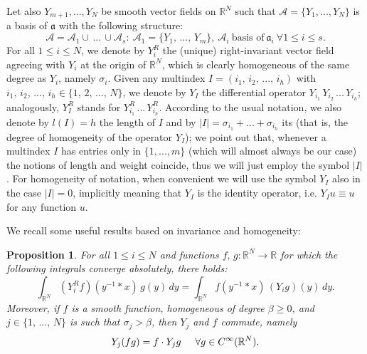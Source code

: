\documentclass{article}
\newtheorem{proposition}[theorem]{Proposition}
\numberwithin{equation}{section}
\begin{document}
Let also $Y_{m+1},...,Y_N$ be smooth vector fields on $\mathbb{R}^N$ such that $\mathcal{A}=\{Y_1,...,Y_N\}$ is a basis of $\mathfrak{a}$ with the following structure:
\begin{equation*}
    \mathcal{A}=\mathcal{A}_1 \cup \, ... \, \cup \mathcal{A}_s: \: \mathcal{A}_1=\{Y_1, \, ..., \, Y_m\}, \: \mathcal{A}_i \: \text{basis of} \: \mathfrak{a}_i \: \forall 1 \leq i \leq s.
\end{equation*}
For all $1 \leq i \leq N$, we denote by $Y_i^R$ the (unique) right-invariant vector field agreeing with $Y_i$ at the origin of $\mathbb{R}^N$, which is clearly homogeneous of the same degree as $Y_i$, namely $\sigma_i$. Given any multindex $I=(i_1, \, i_2, \, ..., \, i_h)$ with $i_1, \, i_2, \, ..., \, i_h \in \{1, \, 2, \, ..., \, N\}$, we denote by $Y_I$ the differential operator $Y_{i_1} \, Y_{i_2} \,... \,Y_{i_h}$; analogously, $Y_I^R$ stands for $Y_{i_1}^R \, ... \, Y_{i_h}^R$. According to the usual notation, we also denote by $l(I)=h$ the length of $I$ and by $|I|=\sigma_{i_1}+...+\sigma_{i_h}$ its  (that is, the degree of homogeneity of the operator $Y_I$); we point out that, whenever a multindex $I$ has entries only in $\{1,...,m\}$ (which will almost always be our case) the notions of length and weight coincide, thus we will just employ the symbol $|I|$. For homogeneity of notation, when convenient we will use the symbol $Y_I$ also in the case $|I|=0$, implicitly meaning that $Y_I$ is the identity operator, i.e. $Y_I u \equiv u$ for any function $u$.

We recall some useful results based on invariance and homogeneity:

\vspace{2mm}

\begin{proposition}
\label{prop: translations and dilations}
    For all $1 \leq i \leq N$ and functions $f, \, g: \mathbb{R}^N \to \mathbb{R}$ for which the following integrals converge absolutely, there holds:
    \begin{equation}
    \label{IPP left-right invariant vf}
        \int_{\mathbb{R}^N} (Y_i^R f)(y^{-1} * x) \, g(y) \, dy = \int_{\mathbb{R}^N}f(y^{-1} * x) \, (Y_i g)(y) \, dy.
    \end{equation}
    Moreover, if $f$ is a smooth function, homogeneous of degree $\beta \geq 0$, and $j \in \{1, \, ..., \, N\}$ is such that $\sigma_j>\beta$, then $Y_j$ and $f$ commute, namely
         \begin{equation}
         \label{Y_j and r_ij commute by homogeneity}
             Y_j(fg)=f \cdot Y_jg \hspace{5mm} \forall g \in C^{\infty}(\mathbb{R}^N).
         \end{equation}
\end{proposition}
\end{document}
